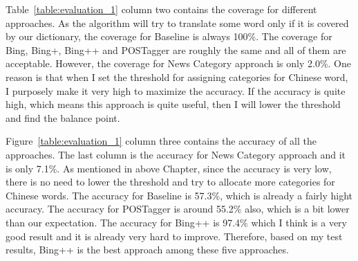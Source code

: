 \begin{CJK}{UTF8}{gbsn}
Table~\ref{table:evaluation_1} column two contains the coverage for different approaches. As the algorithm will try to translate some word only if it is covered by our dictionary, the coverage for Baseline is always 100\%. The coverage for Bing, Bing+, Bing++ and POSTagger are roughly the same and all of them are acceptable. However, the coverage for News Category approach is only 2.0\%. One reason is that when I set the threshold for assigning categories for Chinese word, I purposely make it very high to maximize the accuracy. If the accuracy is quite high, which means this approach is quite useful, then I will lower the threshold and find the balance point.

Figure~\ref{table:evaluation_1} column three contains the accuracy of all the approaches. The last column is the accuracy for News Category approach and it is only 7.1\%. As mentioned in above Chapter, since the accuracy is very low, there is no need to lower the threshold and try to allocate more categories for Chinese words. The accuracy for Baseline is 57.3\%, which is already a fairly hight accuracy. The accuracy for  POSTagger is around 55.2\% also, which is a bit lower than our expectation. The accuracy for Bing++ is 97.4\% which I think is a very good result and it is already very hard to improve. Therefore, based on my test results, Bing++ is the best approach among these five approaches.


\end{CJK}
